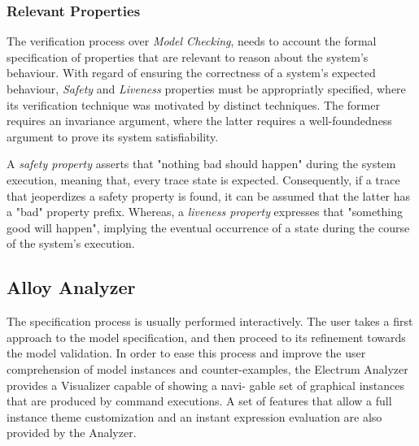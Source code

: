 \subsubsection{Relevant Properties}

The verification process over \textit{Model Checking}, needs to account the formal specification of properties that are relevant to reason about the system's behaviour. \cite{baier2008principles} With regard of ensuring the correctness of a system's expected behaviour, \textit{Safety} and \textit{Liveness} properties must be appropriatly specified, where its verification technique was motivated by distinct techniques. \cite{kindler1994safety} The former requires an invariance argument, where the latter requires a well-foundedness argument to prove its system satisfiability. \cite{alpern1987recognizing}

A \textit{safety property} asserts that "nothing bad should happen" during the system execution, meaning that, every trace state is expected. Consequently, if a trace that jeoperdizes a safety property is found, it can be assumed that the latter has a "bad" property prefix. Whereas, a \textit{liveness property} expresses that "something good will happen", implying the eventual occurrence of a state during the course of the system's execution. \cite{lamport1977proving}



\subsection{Alloy Analyzer}

The specification process is usually performed interactively. The user takes a first approach to the model specification, and then proceed to its refinement towards the model validation. In order to ease this process and improve the user comprehension of model instances and counter-examples, the Electrum Analyzer provides a Visualizer capable of showing a navi- gable set of graphical instances that are produced by command executions. A set of features that allow a full instance theme customization and an instant expression evaluation are also provided by the Analyzer.

